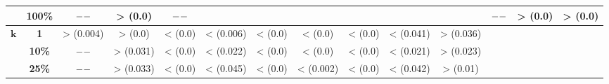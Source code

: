 \begin{table}[htbp]
{\begin{tabular}{cccccccccccccc}
			& \textbf{100\%} & $\---$ & > (0.0) & $\---$ &       &       &       &       &       &       & $\---$ & > (0.0) & > (0.0) \\
	  \midrule
	  \multirow{3}[2]{*}{$\bm{k}$} & \textbf{1} & > (0.004) & > (0.0) & < (0.0) & < (0.006) & < (0.0) & < (0.0) & < (0.0) & < (0.041) & > (0.036) &       &       &  \\
			& \textbf{10\%} & $\---$ & > (0.031) & < (0.0) & < (0.022) & < (0.0) & < (0.0) & < (0.0) & < (0.021) & > (0.023) &       &       &  \\
			& \textbf{25\%} & $\---$ & > (0.033) & < (0.0) & < (0.045) & < (0.0) & < (0.002) & < (0.0) & < (0.042) & > (0.01) &       &       &  \\
	  \bottomrule
	  \end{tabular}}%
\end{table}%
